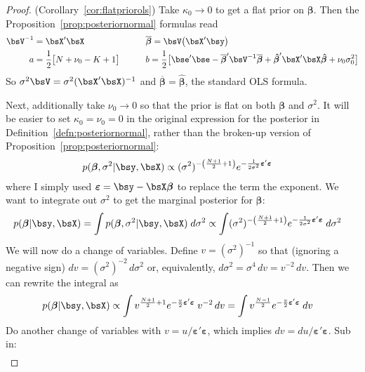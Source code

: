 \documentclass[12pt]{article}
\theoremstyle{plain}
\theoremstyle{definition}
\theoremstyle{remark}
\newcommand{\ra}{\rightarrow}
\newcommand{\bsvarepsilon}{\boldsymbol{\varepsilon}}
\newcommand{\bsbeta}{\boldsymbol{\beta}}
\newcommand{\bshatbeta}{\boldsymbol{\hat{\beta}}}
\newcommand{\bsbarbeta}{\boldsymbol{\overline{\beta}}}
\begin{document}
\clearpage
\begin{proof}(Corollary~\ref{cor:flatpriorols})
Take $\kappa_0\ra0$ to get a flat prior on $\bsbeta$.
Then the Proposition~\ref{prop:posteriornormal} formulas read
\begin{alignat}{3}
  \bsV^{-1}&=\bsX'\bsX
  \qquad
  &&\bsbarbeta
  = \bsV\big(\bsX'\bsy\big) \notag\\
  a&=\frac{1}{2} \big[N+\nu_0-K+1\big]
  \qquad
  &&b=
  \frac{1}{2}
  \big[
    \bse'\bse
    - \bsbarbeta'\bsV^{-1}\bsbarbeta
    + \bshatbeta'\bsX'\bsX\bshatbeta
    + \nu_0\sigma^2_0
  \big]
  \notag
\end{alignat}
So $\sigma^2\bsV=\sigma^2(\bsX'\bsX)^{-1}$ and $\bsbarbeta=\bshatbeta$,
the standard OLS formula.

Next, additionally take $\nu_0\ra 0$ so that the prior is flat on both
$\bsbeta$ and $\sigma^2$. It will be easier to set $\kappa_0=\nu_0=0$ in
the original expression for the posterior in
Definition~\ref{defn:posteriornormal}, rather than the broken-up
version of Proposition~\ref{prop:posteriornormal}:
\begin{align*}
  p(\bsbeta, \sigma^2 | \bsy,\bsX)
  &\propto
  (\sigma^2)^{-\left(\frac{N+1}{2}+1\right)}
  e^{%
    -\frac{1}{2\sigma^2}
    \bsvarepsilon'\bsvarepsilon
  }
\end{align*}
where I simply used $\bsvarepsilon=\bsy-\bsX\bsbeta$ to replace the term
the exponent.
We want to integrate out $\sigma^2$ to get the marginal posterior for
$\bsbeta$:
\begin{align*}
  p(\bsbeta| \bsy,\bsX)
  &=
  \int
  p(\bsbeta, \sigma^2 | \bsy,\bsX)
  \;d\sigma^2
  \propto
  \int
  (\sigma^2)^{-\left(\frac{N+1}{2}+1\right)}
  e^{%
    -\frac{1}{2\sigma^2}
    \bsvarepsilon'\bsvarepsilon
  }
  \;d\sigma^2
\end{align*}
We will now do a change of variables.
Define $v=(\sigma^2)^{-1}$ so that (ignoring a negative sign)
$dv=(\sigma^2)^{-2}\,d\sigma^2$ or, equivalently,
$d\sigma^2=\sigma^4\,dv=v^{-2}\,dv$.
Then we can rewrite the integral as
\begin{align*}
  p(\bsbeta| \bsy,\bsX)
  &\propto
  \int
  v^{\frac{N+1}{2}+1}
  e^{%
    -\frac{v}{2}
    \bsvarepsilon'\bsvarepsilon
  }
  \;v^{-2}\,dv
  =
  \int
  v^{\frac{N-1}{2}}
  e^{%
    -\frac{v}{2}
    \bsvarepsilon'\bsvarepsilon
  }
  \;dv
\end{align*}
Do another change of variables with $v = u
/\bsvarepsilon'\bsvarepsilon$, which implies
$dv = du/\bsvarepsilon'\bsvarepsilon$.
Sub in:
\begin{align*}

\end{align*}
\end{proof}
\end{document}
